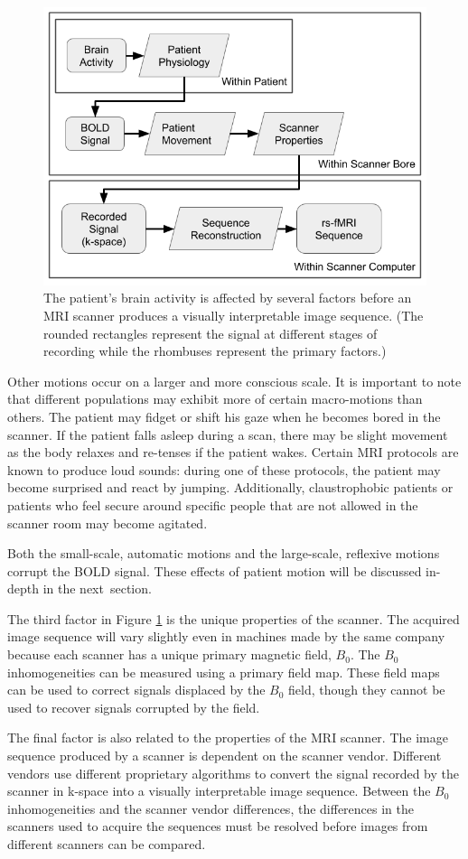 \begin{figure}
\centering
\includegraphics[width=.6\textwidth]{2/rsfMRI-signal-filters.png}
\caption{The patient's brain activity is affected by several factors before an MRI scanner produces a visually interpretable image sequence. (The rounded rectangles represent the signal at different stages of recording while the rhombuses represent the primary factors.)}
\label{ch2:fig:signal-filters}
\end{figure}

Other motions occur on a larger and more conscious scale. It is important to note that different populations may exhibit more of certain macro-motions than others. The patient may fidget or shift his gaze when he becomes bored in the scanner. If the patient falls asleep during a scan, there may be slight movement as the body relaxes and re-tenses if the patient wakes. Certain MRI protocols are known to produce loud sounds: during one of these protocols, the patient may become surprised and react by jumping. Additionally, claustrophobic patients or patients who feel secure around specific people that are not allowed in the scanner room may become agitated. 

Both the small-scale, automatic motions and the large-scale, reflexive motions corrupt the BOLD signal. These effects of patient motion will be discussed in-depth in the next~section.

The third factor in Figure \ref{ch2:fig:signal-filters} is the unique properties of the scanner. The acquired image sequence will vary slightly even in machines made by the same company because each scanner has a unique primary magnetic field, $B_0$. The $B_0$ inhomogeneities can be measured using a primary field map. These field maps can be used to correct signals displaced by the $B_0$ field, though they cannot be used to recover signals corrupted by the field.

The final factor is also related to the properties of the MRI scanner. The image sequence produced by a scanner is dependent on the scanner vendor. Different vendors use different proprietary algorithms to convert the signal recorded by the scanner in k-space into a visually interpretable image sequence. Between the $B_0$ inhomogeneities and the scanner vendor differences, the differences in the scanners used to acquire the sequences must be resolved before images from different scanners can be compared.

